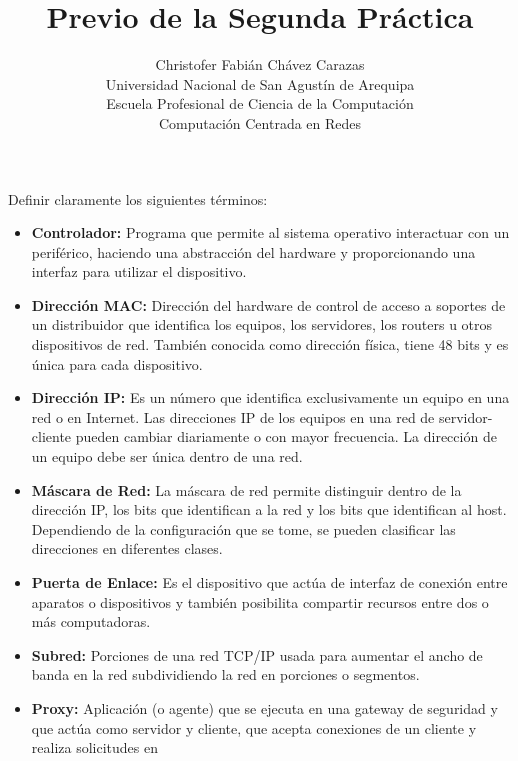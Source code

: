 \documentclass[a4paper,12pt]{article}
\begin{document}
\title{Previo de la Segunda Práctica}
\author{
Christofer Fabián Chávez Carazas \\
\small{Universidad Nacional de San Agustín de Arequipa} \\
\small{Escuela Profesional de Ciencia de la Computación} \\
\small{Computación Centrada en Redes}
}
\date{}

\maketitle

Definir claramente los siguientes términos:

\begin{itemize}
 \item \textbf{Controlador: } Programa que permite al sistema operativo interactuar con un periférico, haciendo una 
 abstracción del hardware y proporcionando una interfaz para utilizar el dispositivo.
 \item \textbf{Dirección MAC: } Dirección del hardware de control de acceso a soportes de un distribuidor que identifica los equipos, los
 servidores, los routers u otros dispositivos de red. También conocida como dirección física, tiene 48 bits y es única para cada dispositivo.
 \item \textbf{Dirección IP: } Es un número que identifica exclusivamente un equipo en una red o en Internet. Las direcciones IP de los equipos en una red
 de servidor-cliente pueden cambiar diariamente o con mayor frecuencia. La dirección de un equipo debe ser única dentro de una red.
 \item \textbf{Máscara de Red: } La máscara de red permite distinguir dentro de la dirección IP, los bits que identifican a la red y los bits que identifican al host.
 Dependiendo de la configuración que se tome, se pueden clasificar las direcciones en diferentes clases.
 \item \textbf{Puerta de Enlace: } Es el dispositivo que actúa de interfaz de conexión entre aparatos o dispositivos y también posibilita compartir recursos entre dos o más computadoras.
 \item \textbf{Subred: } Porciones de una red TCP/IP usada para aumentar el ancho de banda en la red subdividiendo la red en porciones o segmentos.
 \item \textbf{Proxy: } Aplicación (o agente) que se ejecuta en una gateway de seguridad y que actúa como servidor y cliente, que acepta conexiones de un cliente y realiza solicitudes en

\end{itemize}
\end{document}
